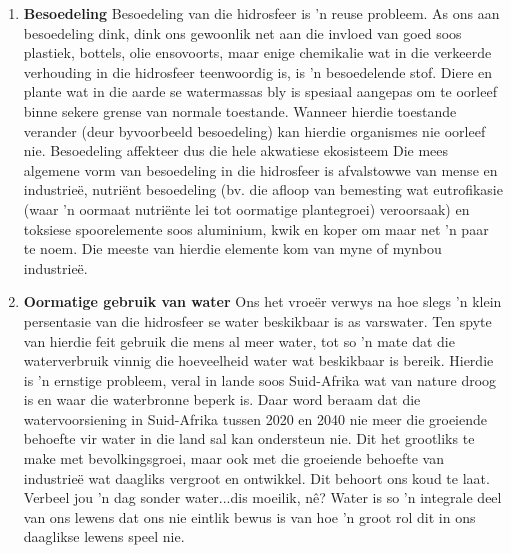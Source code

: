      \label{m38138*id342223}\begin{enumerate}[noitemsep, label=\textbf{\arabic*}. ] 
            \label{m38138*uid91}\item \textbf{Besoedeling}\newline
Besoedeling van die hidrosfeer is  'n reuse probleem. As ons aan besoedeling dink, dink ons gewoonlik net aan die invloed van goed soos plastiek, bottels, olie ensovoorts, maar enige chemikalie wat in die verkeerde verhouding in die hidrosfeer teenwoordig is, is  'n besoedelende stof. Diere en plante wat in die aarde se watermassas bly is spesiaal aangepas om te oorleef binne sekere grense van normale toestande. Wanneer hierdie toestande verander (deur byvoorbeeld besoedeling) kan hierdie organismes nie oorleef nie. Besoedeling affekteer dus die hele akwatiese ekosisteem Die mees algemene vorm van besoedeling in die hidrosfeer is afvalstowwe van mense en industrie\"{e}, nutriënt besoedeling (bv. die afloop van bemesting wat eutrofikasie (waar  'n oormaat nutriënte lei tot oormatige plantegroei) veroorsaak) en toksiese spoorelemente soos aluminium, kwik en koper om maar net  'n paar te noem. Die meeste van hierdie elemente kom van myne of mynbou industrieë.
\label{m38138*uid87}\item \textbf{Oormatige gebruik van water}\newline
Ons het vroe\"{e}r verwys na hoe slegs  'n klein persentasie van die hidrosfeer se water beskikbaar is as varswater. Ten spyte van hierdie feit gebruik die mens al meer water, tot so  'n mate dat die waterverbruik vinnig die hoeveelheid water wat beskikbaar is bereik. Hierdie is  'n ernstige probleem, veral in lande soos Suid-Afrika wat van nature droog is en waar die waterbronne beperk is. Daar word beraam dat die watervoorsiening in Suid-Afrika tussen 2020 en 2040 nie meer die groeiende behoefte vir water in die land sal kan ondersteun nie. Dit het grootliks te make met bevolkingsgroei, maar ook met die groeiende behoefte van industrieë wat daagliks vergroot en ontwikkel. Dit behoort ons koud te laat. Verbeel jou  'n dag sonder water...dis moeilik, nê? Water is so  'n integrale deel van ons lewens dat ons nie eintlik bewus is van hoe  'n groot rol dit in ons daaglikse lewens speel nie.
\end{enumerate}
\label{m38138*secfhsst!!!underscore!!!id1046}
